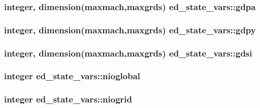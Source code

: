 \subsubsection[{\texorpdfstring{gdpa}{gdpa}}]{\setlength{\rightskip}{0pt plus 5cm}integer, dimension(maxmach,maxgrds) ed\+\_\+state\+\_\+vars\+::gdpa}\hypertarget{namespaceed__state__vars_ad2a53bb636997523d8bdacfaa6f1b9b9}{}\label{namespaceed__state__vars_ad2a53bb636997523d8bdacfaa6f1b9b9}
\subsubsection[{\texorpdfstring{gdpy}{gdpy}}]{\setlength{\rightskip}{0pt plus 5cm}integer, dimension(maxmach,maxgrds) ed\+\_\+state\+\_\+vars\+::gdpy}\hypertarget{namespaceed__state__vars_aac712f975ee36c66ad91c4b4687cdf71}{}\label{namespaceed__state__vars_aac712f975ee36c66ad91c4b4687cdf71}
\subsubsection[{\texorpdfstring{gdsi}{gdsi}}]{\setlength{\rightskip}{0pt plus 5cm}integer, dimension(maxmach,maxgrds) ed\+\_\+state\+\_\+vars\+::gdsi}\hypertarget{namespaceed__state__vars_a77208cdb17b6a08bcdd07c476d5c6139}{}\label{namespaceed__state__vars_a77208cdb17b6a08bcdd07c476d5c6139}
\subsubsection[{\texorpdfstring{nioglobal}{nioglobal}}]{\setlength{\rightskip}{0pt plus 5cm}integer ed\+\_\+state\+\_\+vars\+::nioglobal}\hypertarget{namespaceed__state__vars_ad27fcaec6a546cf46df5c40ddbf1bde1}{}\label{namespaceed__state__vars_ad27fcaec6a546cf46df5c40ddbf1bde1}
\subsubsection[{\texorpdfstring{niogrid}{niogrid}}]{\setlength{\rightskip}{0pt plus 5cm}integer ed\+\_\+state\+\_\+vars\+::niogrid}\hypertarget{namespaceed__state__vars_ad3c5095a2e6e68fda8c698372a614a6e}{}\label{namespaceed__state__vars_ad3c5095a2e6e68fda8c698372a614a6e}
